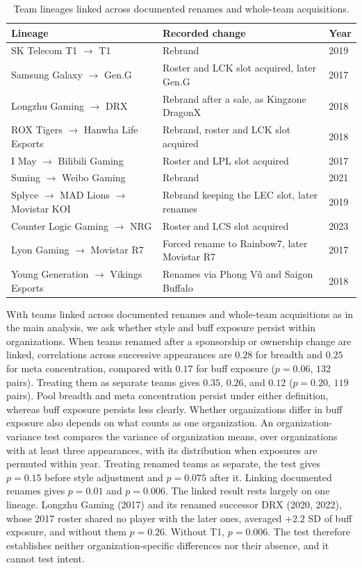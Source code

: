 \documentclass[11pt]{article}
\begin{document}
\begin{table}[h]
\centering
\small
\caption{Team lineages linked across documented renames and whole-team acquisitions.}
\label{tab:lineages}
\begin{tabular}{lll}
\toprule
Lineage & Recorded change & Year \\
\midrule
SK Telecom T1 $\rightarrow$ T1 & Rebrand & 2019 \\
Samsung Galaxy $\rightarrow$ Gen.G & Roster and LCK slot acquired, later Gen.G & 2017 \\
Longzhu Gaming $\rightarrow$ DRX & Rebrand after a sale, as Kingzone DragonX & 2018 \\
ROX Tigers $\rightarrow$ Hanwha Life Esports & Rebrand, roster and LCK slot acquired & 2018 \\
I May $\rightarrow$ Bilibili Gaming & Roster and LPL slot acquired & 2017 \\
Suning $\rightarrow$ Weibo Gaming & Rebrand & 2021 \\
Splyce $\rightarrow$ MAD Lions $\rightarrow$ Movistar KOI & Rebrand keeping the LEC slot, later renames & 2019 \\
Counter Logic Gaming $\rightarrow$ NRG & Roster and LCS slot acquired & 2023 \\
Lyon Gaming $\rightarrow$ Movistar R7 & Forced rename to Rainbow7, later Movistar R7 & 2017 \\
Young Generation $\rightarrow$ Vikings Esports & Renames via Phong V\~{u} and Saigon Buffalo & 2018 \\
\bottomrule
\end{tabular}
\end{table}

With teams linked across documented renames and whole-team acquisitions as in the main analysis, we ask whether style and buff exposure persist within organizations. When teams renamed after a sponsorship or ownership change are linked, correlations across successive appearances are $0.28$ for breadth and $0.25$ for meta concentration, compared with $0.17$ for buff exposure ($p = 0.06$, $132$ pairs). Treating them as separate teams gives $0.35$, $0.26$, and $0.12$ ($p = 0.20$, $119$ pairs). Pool breadth and meta concentration persist under either definition, whereas buff exposure persists less clearly. Whether organizations differ in buff exposure also depends on what counts as one organization. An organization-variance test compares the variance of organization means, over organizations with at least three appearances, with its distribution when exposures are permuted within year. Treating renamed teams as separate, the test gives $p = 0.15$ before style adjustment and $p = 0.075$ after it. Linking documented renames gives $p = 0.01$ and $p = 0.006$. The linked result rests largely on one lineage. Longzhu Gaming (2017) and its renamed successor DRX (2020, 2022), whose 2017 roster shared no player with the later ones, averaged $+2.2$ SD of buff exposure, and without them $p = 0.26$. Without T1, $p = 0.006$. The test therefore establishes neither organization-specific differences nor their absence, and it cannot test intent.
\end{document}
